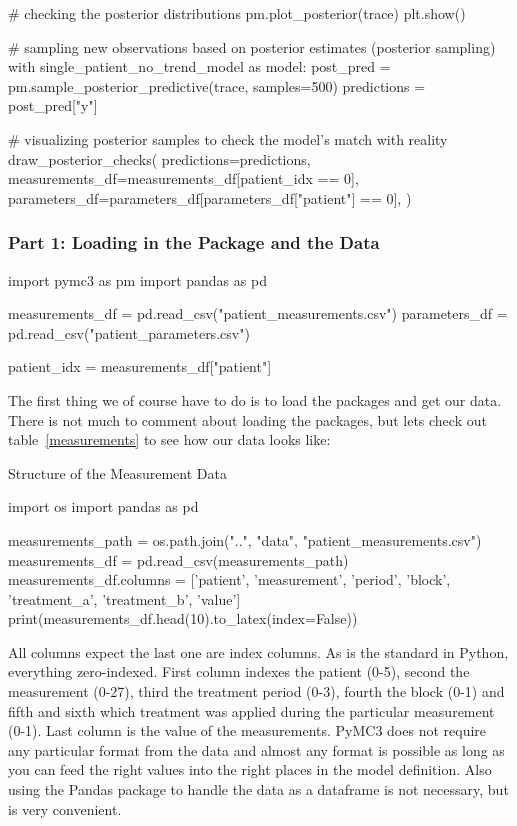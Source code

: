 \documentclass[12pt,a4paper,leqno]{report}
\theoremstyle{plain}
\theoremstyle{definition}
\theoremstyle{remark}
\begin{document}
\begin{pyverbatim}[][fontsize=\footnotesize]
    # checking the posterior distributions
    pm.plot_posterior(trace)
    plt.show()

 
# sampling new observations based on posterior estimates (posterior sampling)
with single_patient_no_trend_model as model:
    post_pred = pm.sample_posterior_predictive(trace, samples=500)
    predictions = post_pred["y"]

# visualizing posterior samples to check the model's match with reality
draw_posterior_checks(
    predictions=predictions,
    measurements_df=measurements_df[patient_idx == 0],
    parameters_df=parameters_df[parameters_df["patient"] == 0],
)
\end{pyverbatim}

\subsubsection*{Part 1: Loading in the Package and the Data}

\bigskip
\begin{pyverbatim}[][fontsize=\footnotesize]
import pymc3 as pm
import pandas as pd

measurements_df = pd.read_csv("patient_measurements.csv")
parameters_df = pd.read_csv("patient_parameters.csv")

patient_idx = measurements_df["patient"]
\end{pyverbatim}
\bigskip

The first thing we of course have to do is to load the packages and get our data. There is
not much to comment about loading the packages, but lets check out table\
\ref{measurements} to see how our data looks like:

\bigskip
\begin{table}[H]
\caption{Structure of the Measurement Data}\label{measurements}
\bigskip
\centering
\begin{pycode}
import os
import pandas as pd

measurements_path = os.path.join("..", "data", "patient_measurements.csv")
measurements_df = pd.read_csv(measurements_path)
measurements_df.columns = ['patient', 'measurement', 'period', 'block',
'treatment_a', 'treatment_b', 'value']
print(measurements_df.head(10).to_latex(index=False))
\end{pycode}
\end{table}
\bigskip

All columns expect the last one are index columns. As is the standard in Python, everything
zero-indexed. First column indexes the patient (0-5), second the
measurement (0-27), third the treatment period (0-3), fourth the block (0-1) and fifth
and sixth which treatment was applied during the particular measurement (0-1). Last
column is the value of the measurements. PyMC3 does not require any particular format from the
data and almost any format is possible as long as you can feed the right values into
the right places in the model definition. Also using the Pandas package to handle the
data as a dataframe is not necessary, but is very convenient.
\end{document}
